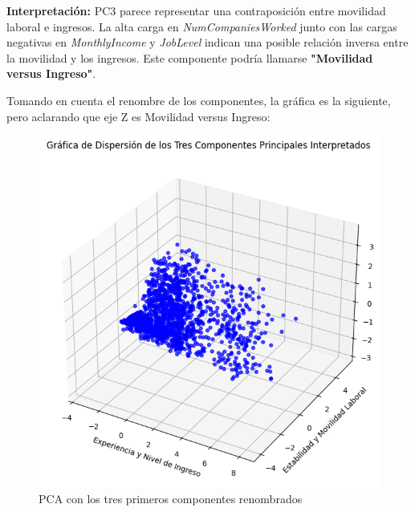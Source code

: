 \textbf{Interpretación:} PC3 parece representar una contraposición entre movilidad laboral e ingresos. La alta carga en \textit{NumCompaniesWorked} junto con las cargas negativas en \textit{MonthlyIncome} y \textit{JobLevel} indican una posible relación inversa entre la movilidad y los ingresos. Este componente podría llamarse \textbf{"Movilidad versus Ingreso"}.

Tomando en cuenta el renombre de los componentes, la gráfica es la siguiente, 
pero aclarando que eje Z es Movilidad versus Ingreso:

\begin{figure}[H]
    \centering
    \includegraphics[width=1\textwidth]{images/pca-3-renamed.png}
    \caption{PCA con los tres primeros componentes renombrados}
    \label{fig:pca_3_components_renamed}
\end{figure}